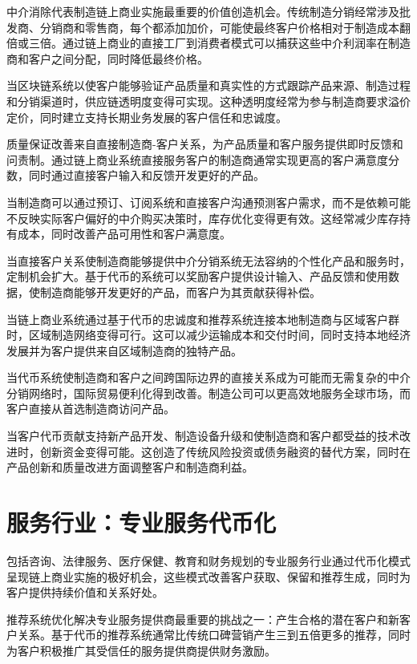 \documentclass[
  Letterpaper,
]{scrbook}
\begin{document}
中介消除代表制造链上商业实施最重要的价值创造机会。传统制造分销经常涉及批发商、分销商和零售商，每个都添加加价，可能使最终客户价格相对于制造成本翻倍或三倍。通过链上商业的直接工厂到消费者模式可以捕获这些中介利润率在制造商和客户之间分配，同时降低最终价格。

当区块链系统以使客户能够验证产品质量和真实性的方式跟踪产品来源、制造过程和分销渠道时，供应链透明度变得可实现。这种透明度经常为参与制造商要求溢价定价，同时建立支持长期业务发展的客户信任和忠诚度。

质量保证改善来自直接制造商-客户关系，为产品质量和客户服务提供即时反馈和问责制。通过链上商业系统直接服务客户的制造商通常实现更高的客户满意度分数，同时通过直接客户输入和反馈开发更好的产品。

当制造商可以通过预订、订阅系统和直接客户沟通预测客户需求，而不是依赖可能不反映实际客户偏好的中介购买决策时，库存优化变得更有效。这经常减少库存持有成本，同时改善产品可用性和客户满意度。

当直接客户关系使制造商能够提供中介分销系统无法容纳的个性化产品和服务时，定制机会扩大。基于代币的系统可以奖励客户提供设计输入、产品反馈和使用数据，使制造商能够开发更好的产品，而客户为其贡献获得补偿。

当链上商业系统通过基于代币的忠诚度和推荐系统连接本地制造商与区域客户群时，区域制造网络变得可行。这可以减少运输成本和交付时间，同时支持本地经济发展并为客户提供来自区域制造商的独特产品。

当代币系统使制造商和客户之间跨国际边界的直接关系成为可能而无需复杂的中介分销网络时，国际贸易便利化得到改善。制造公司可以更高效地服务全球市场，而客户直接从首选制造商访问产品。

当客户代币贡献支持新产品开发、制造设备升级和使制造商和客户都受益的技术改进时，创新资金变得可能。这创造了传统风险投资或债务融资的替代方案，同时在产品创新和质量改进方面调整客户和制造商利益。

\section{服务行业：专业服务代币化}\label{ux670dux52a1ux884cux4e1aux4e13ux4e1aux670dux52a1ux4ee3ux5e01ux5316}

包括咨询、法律服务、医疗保健、教育和财务规划的专业服务行业通过代币化模式呈现链上商业实施的极好机会，这些模式改善客户获取、保留和推荐生成，同时为客户提供持续价值和关系好处。

推荐系统优化解决专业服务提供商最重要的挑战之一：产生合格的潜在客户和新客户关系。基于代币的推荐系统通常比传统口碑营销产生三到五倍更多的推荐，同时为客户积极推广其受信任的服务提供商提供财务激励。
\end{document}
